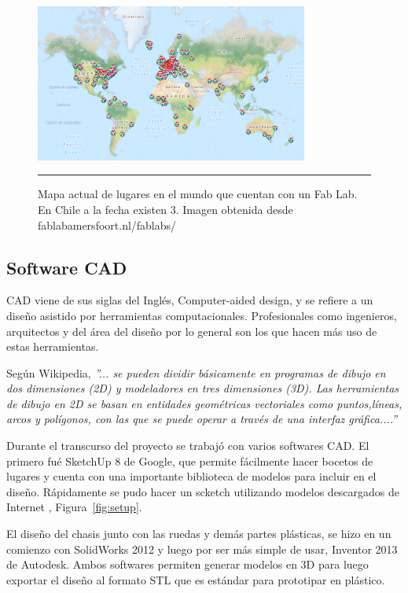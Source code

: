\begin{figure}[htbp]
	\centering
		\includegraphics[width=0.8\textwidth]{./Figures/map.png}
		\rule{35em}{0.5pt}
	\caption[Fablabs]{Mapa actual de lugares en el mundo que cuentan con un Fab Lab. En Chile a la fecha existen 3. Imagen obtenida desde fablabamersfoort.nl/fablabs/}
	\label{fig:Fablabs}
\end{figure}	

\subsection{Software CAD}

CAD viene de sus siglas del Inglés, Computer-aided design, y se refiere a un diseño asistido por herramientas computacionales. Profesionales como ingenieros, arquitectos y del área del diseño por lo general son los que hacen más uso de estas herramientas.

Según Wikipedia, \textit{”... se pueden dividir básicamente en programas de dibujo en dos dimensiones (2D) y modeladores en tres dimensiones (3D). Las herramientas de dibujo en 2D se basan en entidades geométricas vectoriales como puntos,líneas, arcos y polígonos, con las que se puede operar a través de una interfaz gráfica....”}

Durante el transcurso del proyecto se trabajó con varios softwares CAD. El primero fué SketchUp 8 de Google, que permite fácilmente hacer bocetos de lugares y cuenta con una importante biblioteca de modelos para incluir en el diseño. Rápidamente se pudo hacer un scketch utilizando modelos descargados de Internet , Figura~\ref{fig:setup}.

El diseño del chasis junto con las ruedas y demás partes plásticas, se hizo en un comienzo con SolidWorks 2012 y luego por ser más simple de usar, Inventor 2013 de Autodesk. Ambos softwares permiten generar modelos en 3D para luego exportar el diseño al formato STL que es estándar para prototipar en plástico.


